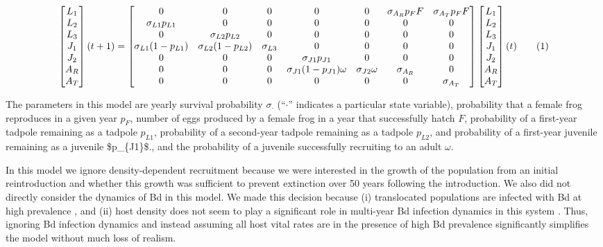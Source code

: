 \documentclass[9pt,twocolumn,twoside,lineno]{pnas-new}
\begin{document}
{\begin{figure}\[
\begin{bmatrix}
L_1 \\
L_2 \\
L_3 \\
J_1 \\
J_2 \\
A_R \\ 
A_T
\end{bmatrix}(t + 1) = 
\begin{bmatrix}
  0 & 0 & 0 & 0 & 0 & \sigma_{A_R} p_F F & \sigma_{A_T} p_F F \\
  \sigma_{L1} p_{L1} & 0 & 0 & 0 & 0 & 0 & 0 \\
  0 & \sigma_{L2} p_{L2} & 0 & 0 & 0 & 0 & 0\\
  \sigma_{L1} (1 - p_{L1}) & \sigma_{L2} (1 - p_{L2}) & \sigma_{L3} & 0 & 0 & 0 & 0 \\
  0 & 0 & 0 & \sigma_{J1} p_{J1} & 0 & 0 & 0 \\
  0 & 0 & 0 & \sigma_{J1} (1 - p_{J1}) \omega & \sigma_{J2} \omega & \sigma_{A_R} & 0 \\
  0 & 0 & 0 & 0 & 0 & 0 & \sigma_{A_T} 
\end{bmatrix} \begin{bmatrix}
L_1 \\
L_2 \\
L_3 \\
J_1 \\
J_2 \\
A_R \\
A_T \\
\end{bmatrix}(t)\numberthis \label{eqn:matrix} 
\]\end{figure}

The parameters in this model are yearly survival probability
\(\sigma_{\cdot}\) (``\(\cdot\)'' indicates a particular state
variable), probability that a female frog reproduces in a given year
\(p_F\), number of eggs produced by a female frog in a year that
successfully hatch \(F\), probability of a first-year tadpole remaining
as a tadpole \(p_{L1}\), probability of a second-year tadpole remaining
as a tadpole \(p_{L2}\), and probability of a first-year juvenile
remaining as a juvenile \$p\_\{J1\}\$., and the probability of a
juvenile successfully recruiting to an adult \(\omega\).

In this model we ignore density-dependent recruitment because we were
interested in the growth of the population from an initial
reintroduction and whether this growth was sufficient to prevent
extinction over 50 years following the introduction. We also did not
directly consider the dynamics of Bd in this model. We made this
decision because (i) translocated populations are infected with Bd at
high prevalence \citep{joseph2018}, and (ii) host density does not seem
to play a significant role in multi-year Bd infection dynamics in this
system \citep{wilber2022}. Thus, ignoring Bd infection dynamics and
instead assuming all host vital rates are in the presence of high Bd
prevalence significantly simplifies the model without much loss of
realism.

}
\end{document}
